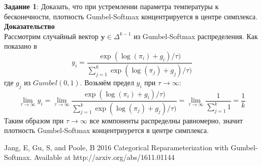 \documentclass[11pt, a4paper]{article}
\begin{document}
\textbf{Задание 1}:
Доказать, что при устремлении параметра температуры к бесконечности, плотность Gumbel-Softmax концентрируется в центре симплекса.
\\


\textbf{Доказательство}\\
Рассмотрим случайный вектор $\bm{y} \in \Delta^{k-1}$ из  Gumbel-Softmax распределения. Как показано в ~\cite{gumbel} $$y_i = \frac{\exp{(\log{(\pi_i)} + g_i)/\tau)}}{\sum_{j=1}^{k} \exp{(\log{(\pi_j)} + g_j)/\tau})} $$
где $g_j$ из $Gumbel(0, 1)$. Возьмём предел $y_i$ при $\tau \rightarrow \infty$:
   $$\lim\limits_{\tau \rightarrow \infty} y_i = \lim\limits_{\tau \rightarrow \infty} \frac{\exp{(\log{(\pi_i)} + g_i)/\tau)}}{\sum_{j=1}^{k} \exp{(\log{(\pi_j)} + g_j)/\tau})} = \lim\limits_{\tau \rightarrow \infty} \frac{1}{\sum_{j=1}^{k} 1} = \frac{1}{k}$$
   Таким образом при $\tau \rightarrow \infty$ все компоненты распределны равномерно, значит плотность Gumbel-Softmax концентриурется в центре симплекса.



\begin{thebibliography}{9}
	Jang, E, Gu, S, and Poole, B 2016 Categorical Reparameterization with Gumbel-Softmax. Available at http://arxiv.org/abs/1611.01144
\end{thebibliography}
\end{document}
